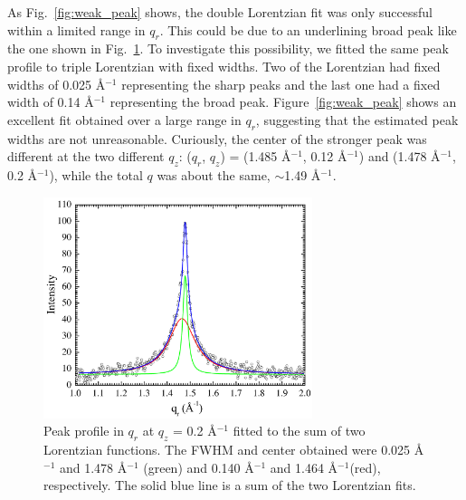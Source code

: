 As Fig.~\ref{fig:weak_peak}
shows, the double Lorentzian fit was only successful within a limited range
in $q_r$. This could be due to an underlining broad peak like the one
shown in Fig.~\ref{fig:strong_peak}. To investigate this possibility,
we fitted the same peak profile to triple Lorentzian with fixed widths.
Two of the Lorentzian had fixed widths of 0.025 \AA$^{-1}$ representing 
the sharp peaks and the last one had a fixed width of 0.14 \AA$^{-1}$
representing the broad peak. Figure~\ref{fig:weak_peak} shows an excellent
fit obtained over a large range in $q_r$, suggesting that the estimated
peak widths are not unreasonable.
Curiously, the center of the stronger peak was different at the two 
different $q_z$: ($q_r$, $q_z$) = (1.485 \AA$^{-1}$, 0.12 \AA$^{-1}$)
and (1.478 \AA$^{-1}$, 0.2 \AA$^{-1}$), while the total $q$ was about
the same, $\sim$1.49 \AA$^{-1}$.

\begin{figure}[htbp]
  \centering
  \includegraphics[width=0.7\textwidth]{figures/ripple/nGIWAXS/strong_peak_Lorentz}
  \caption[Peak profile in $q_r$ at $q_z$ = 0.2 \AA$^{-1}$ 
  fitted to the sum of two Lorentzians functions]{Peak profile in $q_r$ at $q_z$ = 0.2 \AA$^{-1}$ 
  fitted to the sum of two Lorentzian functions. The FWHM and center obtained 
  were 0.025 \AA$^{-1}$ and 1.478 \AA$^{-1}$ (green) and 0.140 \AA$^{-1}$ 
  and 1.464 \AA$^{-1}$(red), respectively. The solid blue line is a sum
  of the two Lorentzian fits.}
  \label{fig:strong_peak}
\end{figure}

